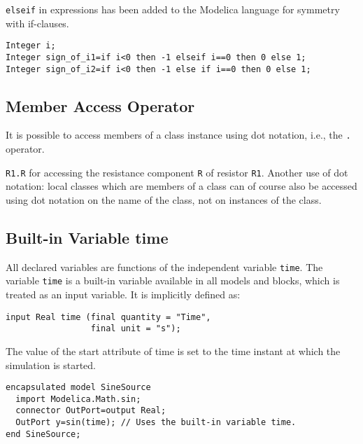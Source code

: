 \begin{nonnormative}
\lstinline!elseif! in expressions has been added to the Modelica language for symmetry with if-clauses.
\end{nonnormative}

\begin{example}
\begin{lstlisting}[language=modelica]
Integer i;
Integer sign_of_i1=if i<0 then -1 elseif i==0 then 0 else 1;
Integer sign_of_i2=if i<0 then -1 else if i==0 then 0 else 1;
\end{lstlisting}
\end{example}

\subsection{Member Access Operator}\label{member-access-operator}

It is possible to access members of a class instance using dot notation,
i.e., the \lstinline!.! operator.

\begin{example}
\lstinline!R1.R! for accessing the resistance component \lstinline!R!
of resistor \lstinline!R1!. Another use of dot notation: local classes
which are members of a class can of course also be accessed using dot
notation on the name of the class, not on instances of the class.
\end{example}

\subsection{Built-in Variable time}\label{built-in-variable-time}

All declared variables are functions of the independent variable \lstinline!time!.
The variable \lstinline!time! is a built-in variable available in all models and
blocks, which is treated as an input variable. It is implicitly defined
as:
\begin{lstlisting}[language=modelica]
input Real time (final quantity = "Time",
                 final unit = "s");
\end{lstlisting}

The value of the start attribute of time is set to the time instant at
which the simulation is started.

\begin{example}
\begin{lstlisting}[language=modelica]
encapsulated model SineSource
  import Modelica.Math.sin;
  connector OutPort=output Real;
  OutPort y=sin(time); // Uses the built-in variable time.
end SineSource;
\end{lstlisting}
\end{example}

